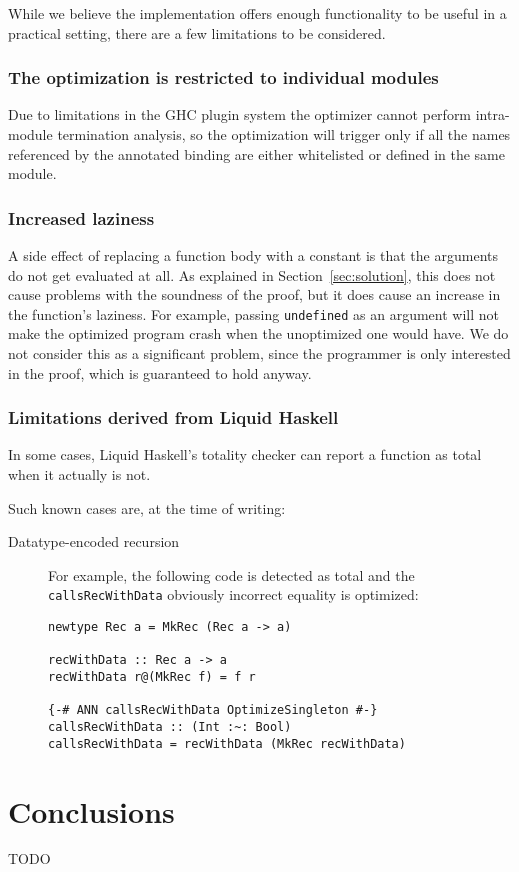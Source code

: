 While we believe the implementation offers enough functionality to be useful in a practical setting, there are a few limitations to be considered.

\subsection{The optimization is restricted to individual modules}
\label{subsec:single-module}

Due to limitations in the GHC plugin system the optimizer cannot perform intra-module termination analysis, so the optimization will trigger only if all the names referenced by the annotated binding are either whitelisted or defined in the same module.

\subsection{Increased laziness}
\label{subsec:limitations-laziness}

A side effect of replacing a function body with a constant is that the arguments do not get evaluated at all.
As explained in Section~\ref{sec:solution}, this does not cause problems with the soundness of the proof, but it does cause an increase in the function's laziness.
For example, passing \texttt{undefined} as an argument will not make the optimized program crash when the unoptimized one would have.
We do not consider this as a significant problem, since the programmer is only interested in the proof, which is guaranteed to hold anyway.

\subsection{Limitations derived from Liquid Haskell}
\label{subsec:limitations-lh}

In some cases, Liquid Haskell's totality checker can report a function as total when it actually is not.

Such known cases are, at the time of writing:

\begin{description}
  \item[Datatype-encoded recursion]
    For example, the following code is detected as total and the \texttt{callsRecWithData} obviously incorrect equality is optimized:
    \begin{lstlisting}
newtype Rec a = MkRec (Rec a -> a)

recWithData :: Rec a -> a
recWithData r@(MkRec f) = f r

{-# ANN callsRecWithData OptimizeSingleton #-}
callsRecWithData :: (Int :~: Bool)
callsRecWithData = recWithData (MkRec recWithData)
    \end{lstlisting}
\end{description}

\chapter{Conclusions}
\label{cha:conclusions}

TODO


